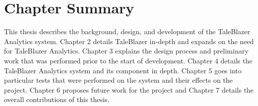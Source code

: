 \section{Chapter Summary}
This thesis describes the background, design, and development of the TaleBlazer Analytics system. Chapter 2 details TaleBlazer in-depth and expands on the need for TaleBlazer Analytics. Chapter 3 explains the design process and preliminary work that was performed prior to the start of development. Chapter 4 details the TaleBlazer Analytics system and its component in depth. Chapter 5 goes into particular tests that were performed on the system and their effects on the project. Chapter 6 proposes future work for the project and Chapter 7 details the overall contributions of this thesis.




